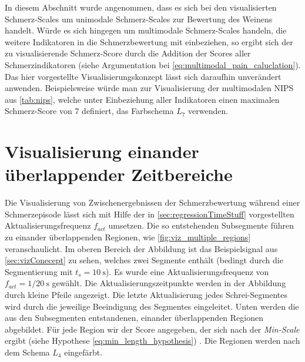 In diesem Abschnitt wurde angenommen, dass es sich bei den visualisierten Schmerz-Scales um unimodale Schmerz-Scales zur Bewertung des Weinens handelt. Würde es sich hingegen um multimodale Schmerz-Scales handeln, die weitere Indikatoren in die Schmerzbewertung mit einbeziehen, so ergibt sich der zu visualisierende Schmerz-Score durch die Addition der Scores aller Schmerzindikatoren (siehe Argumentation bei  \autoref{eq:multimodal_pain_caluclation}). Das hier vorgestellte Visualisierungskonzept lässt sich daraufhin unverändert anwenden. Beispielsweise würde man zur Visualisierung der multimodalen NIPS aus \autoref{tab:nips}, welche unter Einbeziehung aller Indikatoren einen maximalen Schmerz-Score von 7 definiert, das Farbschema $L_7$ verwenden.

 
\section{Visualisierung einander überlappender Zeitbereiche}
\label{sec:vizWithOverlap}
 
Die Visualisierung von \glqq Zwischenergebnissen\grqq{} der Schmerzbewertung während einer Schmerzepisode lässt sich mit Hilfe der in \autoref{sec:regressionTimeStuff} vorgestellten Aktualisierungsfrequenz $f_{act}$ umsetzen. Die so entstehenden Subsegmente führen zu einander überlappenden Regionen, wie \autoref{fig:viz_multiple_regions} veranschaulicht. Im oberen Bereich der Abbildung ist das Beispielsignal aus \autoref{sec:vizConecept} zu sehen, welches zwei Segmente enthält (bedingt durch die Segmentierung mit $t_s = \SI{10}{\second}$). Es wurde eine Aktualisierungsfrequenz von  $f_{act} = 1/ \SI{20}{\second}$ gewählt. Die Aktualisierungszeitpunkte werden in der Abbildung durch kleine Pfeile angezeigt. Die letzte Aktualisierung jedes Schrei-Segmentes wird durch die jeweilige Beeindigung des Segmentes eingeleitet. Unten werden die aus den Subsegmenten entstandenen, einander überlappenden Regionen abgebildet. Für jede Region wir der Score angegeben, der sich nach der \emph{Min-Scale} ergibt (siehe Hypothese \autoref{eq:min_length_hypothesis}) . Die Regionen werden nach dem Schema $L_4$ eingefärbt.

